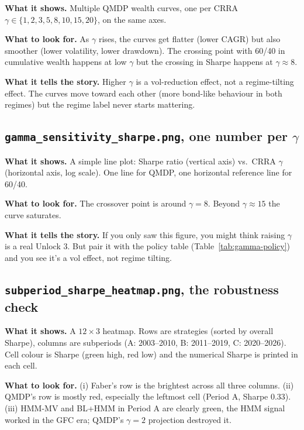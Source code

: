 \documentclass[11pt]{article}
\begin{document}
\textbf{What it shows.} Multiple QMDP wealth curves, one per CRRA $\gamma \in \{1, 2, 3, 5, 8, 10, 15, 20\}$, on the same axes.

\textbf{What to look for.} As $\gamma$ rises, the curves get flatter (lower CAGR) but also smoother (lower volatility, lower drawdown). The crossing point with 60/40 in cumulative wealth happens at low $\gamma$ but the crossing in Sharpe happens at $\gamma \approx 8$.

\textbf{What it tells the story.} Higher $\gamma$ is a vol-reduction effect, not a regime-tilting effect. The curves move toward each other (more bond-like behaviour in both regimes) but the regime label never starts mattering.

\subsection{\texttt{gamma\_sensitivity\_sharpe.png}, one number per $\gamma$}

\textbf{What it shows.} A simple line plot: Sharpe ratio (vertical axis) vs.\ CRRA $\gamma$ (horizontal axis, log scale). One line for QMDP, one horizontal reference line for 60/40.

\textbf{What to look for.} The crossover point is around $\gamma = 8$. Beyond $\gamma \approx 15$ the curve saturates.

\textbf{What it tells the story.} If you only saw this figure, you might think raising $\gamma$ is a real Unlock 3. But pair it with the policy table (Table~\ref{tab:gamma-policy}) and you see it's a vol effect, not regime tilting.

\subsection{\texttt{subperiod\_sharpe\_heatmap.png}, the robustness check}

\textbf{What it shows.} A $12 \times 3$ heatmap. Rows are strategies (sorted by overall Sharpe), columns are subperiods (A: 2003--2010, B: 2011--2019, C: 2020--2026). Cell colour is Sharpe (green high, red low) and the numerical Sharpe is printed in each cell.

\textbf{What to look for.} (i) Faber's row is the brightest across all three columns. (ii) QMDP's row is mostly red, especially the leftmost cell (Period A, Sharpe 0.33). (iii) HMM-MV and BL+HMM in Period A are clearly green, the HMM signal worked in the GFC era; QMDP's $\gamma = 2$ projection destroyed it.
\end{document}
